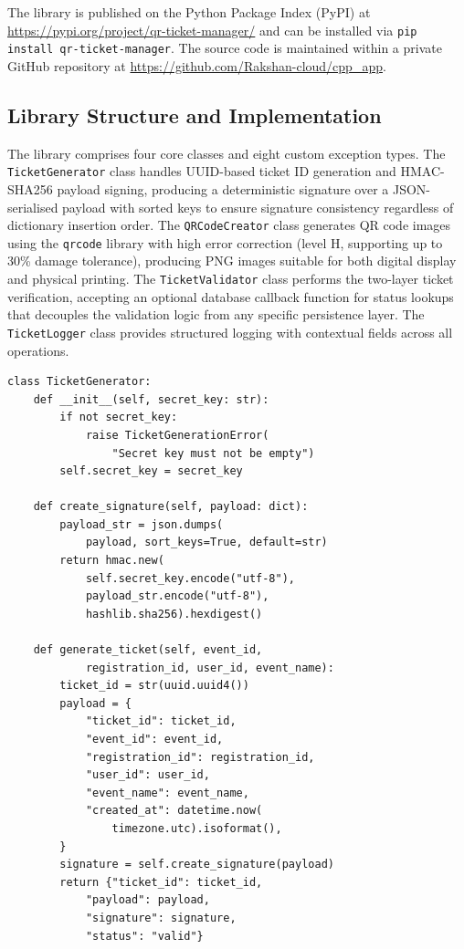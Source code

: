 \documentclass[conference]{IEEEtran}
\begin{document}
The library is published on the Python Package Index (PyPI) at \url{https://pypi.org/project/qr-ticket-manager/} and can be installed via \texttt{pip install qr-ticket-manager}. The source code is maintained within a private GitHub repository at \url{https://github.com/Rakshan-cloud/cpp\_app}.

\subsection{Library Structure and Implementation}

The library comprises four core classes and eight custom exception types. The \texttt{TicketGenerator} class handles UUID-based ticket ID generation and HMAC-SHA256 payload signing, producing a deterministic signature over a JSON-serialised payload with sorted keys to ensure signature consistency regardless of dictionary insertion order. The \texttt{QRCodeCreator} class generates QR code images using the \texttt{qrcode} library with high error correction (level H, supporting up to 30\% damage tolerance), producing PNG images suitable for both digital display and physical printing. The \texttt{TicketValidator} class performs the two-layer ticket verification, accepting an optional database callback function for status lookups that decouples the validation logic from any specific persistence layer. The \texttt{TicketLogger} class provides structured logging with contextual fields across all operations.

\begin{lstlisting}[caption={HMAC-SHA256 ticket generation in TicketGenerator.}, label={lst:generator}]
class TicketGenerator:
    def __init__(self, secret_key: str):
        if not secret_key:
            raise TicketGenerationError(
                "Secret key must not be empty")
        self.secret_key = secret_key

    def create_signature(self, payload: dict):
        payload_str = json.dumps(
            payload, sort_keys=True, default=str)
        return hmac.new(
            self.secret_key.encode("utf-8"),
            payload_str.encode("utf-8"),
            hashlib.sha256).hexdigest()

    def generate_ticket(self, event_id,
            registration_id, user_id, event_name):
        ticket_id = str(uuid.uuid4())
        payload = {
            "ticket_id": ticket_id,
            "event_id": event_id,
            "registration_id": registration_id,
            "user_id": user_id,
            "event_name": event_name,
            "created_at": datetime.now(
                timezone.utc).isoformat(),
        }
        signature = self.create_signature(payload)
        return {"ticket_id": ticket_id,
            "payload": payload,
            "signature": signature,
            "status": "valid"}
\end{lstlisting}
\end{document}
